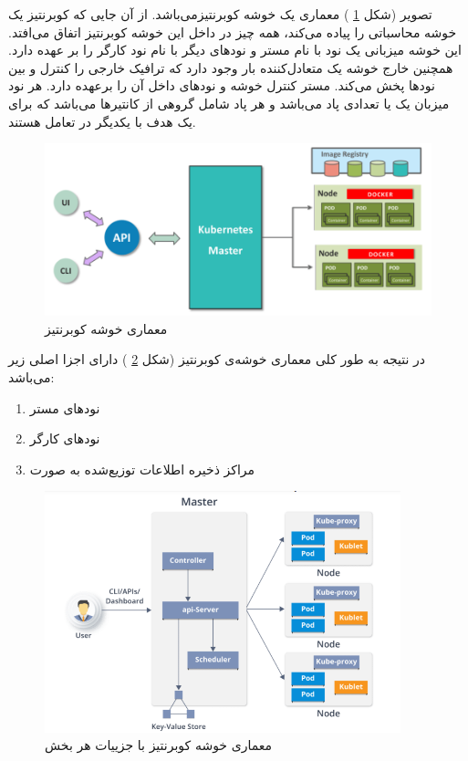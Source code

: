 تصویر (شکل 
\ref{تصویر 2-10}
)
معماری یک خوشه کوبرنتیزمی‌باشد. از آن جایی که کوبرنتیز یک خوشه محاسباتی را پیاده می‌کند، همه چیز در داخل این خوشه کوبرنتیز اتفاق می‌افتد. این خوشه میزبانی یک نود با نام مستر و نودهای دیگر با نام نود کارگر را بر عهده دارد. همچنین خارج خوشه یک متعادل‌کننده بار وجود دارد که ترافیک خارجی را کنترل و بین نودها پخش می‌کند.  مستر کنترل خوشه و نودهای داخل آن را برعهده دارد. هر نود میزبان یک یا تعدادی پاد می‌باشد و هر پاد شامل گروهی از کانتیرها می‌باشد که برای یک هدف با یکدیگر در تعامل هستند.

\begin{figure}[!h]
	\centering
	\includegraphics[height=5cm]{fig2-10}
	\caption{معماری خوشه کوبرنتیز}
	\label{تصویر 2-10}
\end{figure}

در نتیجه به طور کلی معماری خوشه‌ی کوبرنتیز (شکل
\ref{تصویر 2-11}
) دارای اجزا اصلی زیر می‌باشد:

\begin{enumerate}
	\item 
	نودهای مستر
	\item 
	نود‌های کارگر
	\item 
	مراکز ذخیره اطلاعات توزیع‌شده به صورت
\end{enumerate}

\begin{figure}[!h]
	\centering
	\includegraphics[height=7cm]{fig2-11}
	\caption{ معماری خوشه کوبرنتیز با جزییات هر بخش}
	\label{تصویر 2-11}
\end{figure}



